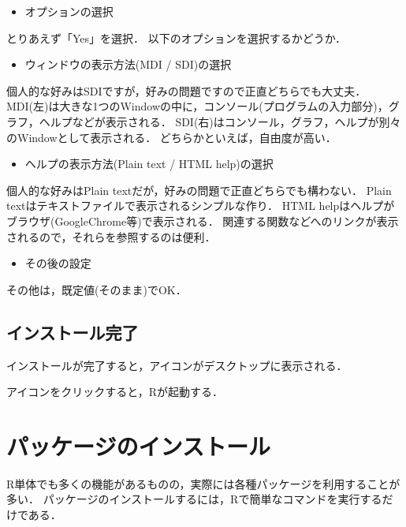 \documentclass[
]{article}
\providecommand{\tightlist}{%
  \setlength{\itemsep}{0pt}\setlength{\parskip}{0pt}}
\begin{document}
\begin{itemize}
\tightlist
\item
  オプションの選択
\end{itemize}

とりあえず「Yes」を選択．
以下のオプションを選択するかどうか．

\begin{itemize}
\tightlist
\item
  ウィンドウの表示方法(MDI / SDI)の選択
\end{itemize}

個人的な好みはSDIですが，好みの問題ですので正直どちらでも大丈夫．
MDI(左)は大きな1つのWindowの中に，コンソール(プログラムの入力部分)，グラフ，ヘルプなどが表示される．
SDI(右)はコンソール，グラフ，ヘルプが別々のWindowとして表示される．
どちらかといえば，自由度が高い．

\begin{itemize}
\tightlist
\item
  ヘルプの表示方法(Plain text / HTML help)の選択
\end{itemize}

個人的な好みはPlain textだが，好みの問題で正直どちらでも構わない．
Plain textはテキストファイルで表示されるシンプルな作り．
HTML helpはヘルプがブラウザ(GoogleChrome等)で表示される．
関連する関数などへのリンクが表示されるので，それらを参照するのは便利．

\begin{itemize}
\tightlist
\item
  その後の設定
\end{itemize}

その他は，既定値(そのまま)でOK．

\hypertarget{ux30a4ux30f3ux30b9ux30c8ux30fcux30ebux5b8cux4e86}{%
\subsection{インストール完了}\label{ux30a4ux30f3ux30b9ux30c8ux30fcux30ebux5b8cux4e86}}

インストールが完了すると，アイコンがデスクトップに表示される．

アイコンをクリックすると，Rが起動する．

\hypertarget{package}{%
\section{パッケージのインストール}\label{package}}

R単体でも多くの機能があるものの，実際には各種パッケージを利用することが多い．
パッケージのインストールするには，Rで簡単なコマンドを実行するだけである．
\end{document}
